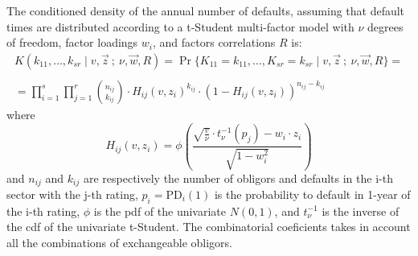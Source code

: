 \documentclass[11pt,fleqn]{book} %
\begin{document}
\begin{proposition}
	The conditioned density of the annual number of defaults, assuming 
	that default times are distributed according to a t-Student multi-factor 
	model with $\nu$ degrees of freedom, factor loadings $w_i$, and 
	factors correlations $R$ is:
	\begin{displaymath}
		\begin{array}{l}
			K(k_{11},\dots,k_{sr} \mid v,\vec{z}\ ;\ \nu,\vec{w}, R) = 
			\Pr\{K_{11}=k_{11},\dots,K_{sr}=k_{sr} \mid v,\vec{z}\ ;\ \nu, \vec{w}, R\} = \\
			                                                                                                                                 \\
			= \displaystyle \prod_{i=1}^s \prod_{j=1}^r \binom{n_{ij}}{k_{ij}} \cdot
			H_{ij}(v,z_i)^{k_{ij}} \cdot
			\left( 1 - H_{ij}(v,z_i) \right)^{n_{ij}-k_{ij}}
		\end{array}
	\end{displaymath}
	where
	\begin{displaymath}
		H_{ij}(v,z_i) = \phi\left(  
		\frac{\sqrt{\frac{v}{\nu}} \cdot t_{\nu}^{-1}(p_j) - w_i\cdot z_i}{\sqrt{1-w_i^2}}
		\right)
	\end{displaymath}
	and $n_{ij}$ and $k_{ij}$ are respectively the number of obligors and 
	defaults in the i-th sector with the j-th rating, $p_i = \text{PD}_i(1)$ 
	is the probability to default in 1-year of the i-th rating,
	$\phi$ is the pdf of the univariate $N(0,1)$, and $t_{\nu}^{-1}$ is the 
	inverse of the cdf of the univariate t-Student. The combinatorial coeficients 
	takes in account all the combinations of exchangeable obligors.
\end{proposition}
\end{document}
